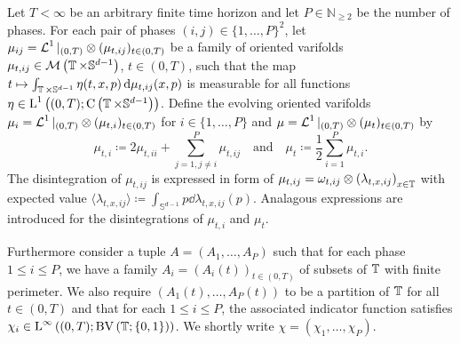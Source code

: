 \begin{definition}
	\label{de_giorgi_varifold_solutions_for_mmcf}
	Let $T < \infty $ be an arbitrary finite time horizon and let $ P \in 
	\mathbb{ N }_{ \geq 2 } $ be the number of phases. For each 
	pair of phases $ ( i , j ) \in \{ 1 , \dotsc, P \}^{ 2 } $, let 
	$ \mu_{ i j } = \operatorname{\mathcal{L}}^{ 1 }|_{ ( 0 , T ) } \otimes ( \mu_{ t , i j } )_{ t 
	\in ( 0 , T ) } $ be a family of oriented 
	varifolds 
	$ \mu_{ t , ij } \in \mathcal{ M } \left(
	\operatorname{\mathbb{T}} \times \mathbb{ S }^{ d - 1 }
	\right) $,
	$ t \in ( 0 , T ) $, such that the map 
	$ t \mapsto \int_{ \operatorname{\mathbb{T}} \times \mathbb{ S }^{ d - 1 } }
	\eta ( t , x , p )
	\dd{ \mu_{ t ,i j } ( x, p ) }$
	is measurable for all functions 
	$ \eta \in \operatorname{L}^{ 1 } \left(	
	( 0 , T ) ; \operatorname{C} \left( \operatorname{\mathbb{T}} \times \mathbb{ S }^{ d- 1 } 
	\right) 
	\right) $.
	Define the evolving oriented varifolds $ \mu_{ i } = \operatorname{\mathcal{L}}^{ 1 }|_{ ( 0 , T 
		) } \otimes ( \mu_{ t , i } )_{ t \in ( 0 , T ) } $ for $ i \in \{ 1, 
	\dotsc, P \} $ and $ \mu = \operatorname{\mathcal{L}}^{ 1 }|_{ ( 0 , T ) } \otimes ( \mu_{ t 
	} )_{ t \in ( 0 , T ) } $ by 
	\begin{equation}
		\label{moon_equation}
		\mu_{ t , i }
		\coloneqq
		2 \mu_{ t , i i }
		+
		\sum_{ j = 1 , j \neq i }^{ P }
		\mu_{ t , i j }
		\quad \text{and} \quad
		\mu_{ t }
		\coloneqq
		\frac{ 1 }{ 2 }
		\sum_{ i = 1 }^{ P }
		\mu_{ t, i }.
	\end{equation}
	The disintegration of $ \mu_{ t , i j } $ is expressed in form of 
	$ \mu_{ t , i j } = \omega_{ t ,i j } \otimes \left( \lambda _{ t , x , i j 
	} \right)_{ x \in \operatorname{\mathbb{T}} } $ with expected value
	$ \langle \lambda_{ t , x , i j } \rangle 
	\coloneqq
	\int_{ \mathbb{ S }^{ d - 1 } }
	p 
	\dd{ \lambda_{ t , x , i j } ( p ) } $.
	Analagous expressions are introduced for the disintegrations of $ \mu_{ t, 
		i } $ and $ \mu_{ t } $.
	
	Furthermore consider a tuple 
	$ A = \left( A_{ 1 } , \dotsc , A_{ P } \right) $ 
	such that for each phase $ 1 \leq i \leq P $, we have a family
	$ A_{ i } = ( A_{ i } ( t ) )_{ t \in ( 0 , T ) } $ of subsets of $ 
	\operatorname{\mathbb{T}} $ with finite perimeter. We also require 
	$ \left( A_{ 1 } ( t ) , \dotsc, A_{ P } ( t ) \right) $
	to be a partition of $ \operatorname{\mathbb{T}} $ for all $ t \in ( 0 , T ) $ and 
	that for each $ 1 \leq i \leq P $, the associated indicator function 
	satisfies 
	$ \chi_{ i } \in \operatorname{L}^{ \infty } \left(
	( 0 , T ) ;
	\operatorname{BV} \left( \operatorname{\mathbb{T}} ; \{ 0 , 1 \} \right)
	\right) $.
	We shortly write $ \chi = \left( \chi_{ 1 } , \dotsc, \chi_{ P } \right) $.
	

\end{definition}
